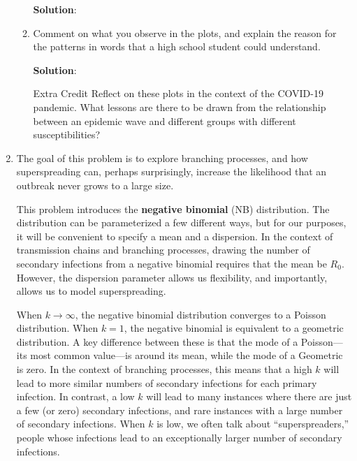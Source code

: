 \documentclass[11pt]{article}
\begin{document}
\begin{enumerate}
\begin{enumerate}[label=\alph*.]
	\begin{tcolorbox}[breakable]
		\textbf{Solution}:\\
		
	\end{tcolorbox}
	
	\item Comment on what you observe in the plots, and explain the reason for the patterns in words that a high school student could understand.
	
	\begin{tcolorbox}[breakable]
		\textbf{Solution}:\\
		
	\end{tcolorbox}
	
	\item[Extra Credit] Reflect on these plots in the context of the COVID-19 pandemic. What lessons are there to be drawn from the relationship between an epidemic wave and different groups with different susceptibilities?
\end{enumerate}
\clearpage

\item The goal of this problem is to explore branching processes, and how superspreading can, perhaps surprisingly, increase the likelihood that an outbreak never grows to a large size.

This problem introduces the {\bf negative binomial} (NB) distribution. The distribution can be parameterized a few different ways, but for our purposes, it will be convenient to specify a mean and a dispersion. In the context of transmission chains and branching processes, drawing the number of secondary infections from a negative binomial requires that the mean be $R_0$. However, the dispersion parameter allows us flexibility, and importantly, allows us to model superspreading. 

When $k \to \infty$, the negative binomial distribution converges to a Poisson distribution. When $k = 1$, the negative binomial is equivalent to a geometric distribution. A key difference between these is that the mode of a Poisson---its most common value---is around its mean, while the mode of a Geometric is zero. In the context of branching processes, this means that a high $k$ will lead to more similar numbers of secondary infections for each primary infection. In contrast, a low $k$ will lead to many instances where there are just a few (or zero) secondary infections, and rare instances with a large number of secondary infections. When $k$ is low, we often talk about ``superspreaders,'' people whose infections lead to an exceptionally larger number of secondary infections. 


\end{enumerate}
\end{document}
